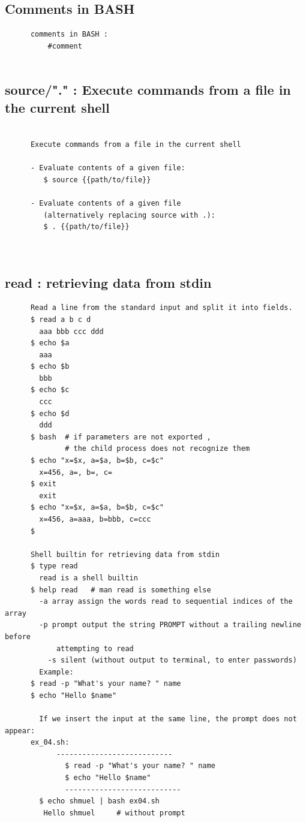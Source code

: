\documentclass[a4paper,12pt]{article}
\begin{document}
\subsection{Comments in BASH}
\begin{verbatim}
      comments in BASH : 
          #comment
           
\end{verbatim}



\subsection{source/"." :  Execute commands from a file in the current shell}
\begin{verbatim}
      
      Execute commands from a file in the current shell
      
      - Evaluate contents of a given file:
         $ source {{path/to/file}}

      - Evaluate contents of a given file 
         (alternatively replacing source with .):
         $ . {{path/to/file}}

           
\end{verbatim}


\subsection{read :  retrieving data from stdin}
\begin{verbatim}
      Read a line from the standard input and split it into fields.
      $ read a b c d
        aaa bbb ccc ddd
      $ echo $a
        aaa
      $ echo $b
        bbb
      $ echo $c
        ccc
      $ echo $d
        ddd
      $ bash  # if parameters are not exported , 
              # the child process does not recognize them
      $ echo "x=$x, a=$a, b=$b, c=$c"
        x=456, a=, b=, c=
      $ exit
        exit
      $ echo "x=$x, a=$a, b=$b, c=$c"
        x=456, a=aaa, b=bbb, c=ccc
      $ 

      Shell builtin for retrieving data from stdin
      $ type read
        read is a shell builtin
      $ help read   # man read is something else
        -a array assign the words read to sequential indices of the array
        -p prompt output the string PROMPT without a trailing newline before
    		attempting to read
    	  -s silent (without output to terminal, to enter passwords)	  
    	Example: 	
      $ read -p "What's your name? " name
      $ echo "Hello $name"	
    	
    	If we insert the input at the same line, the prompt does not appear:
      ex_04.sh:
            ---------------------------    	
    	      $ read -p "What's your name? " name 
    	      $ echo "Hello $name" 
    	      ---------------------------
    	$ echo shmuel | bash ex04.sh 
         Hello shmuel	  # without prompt           
\end{verbatim}
\end{document}
